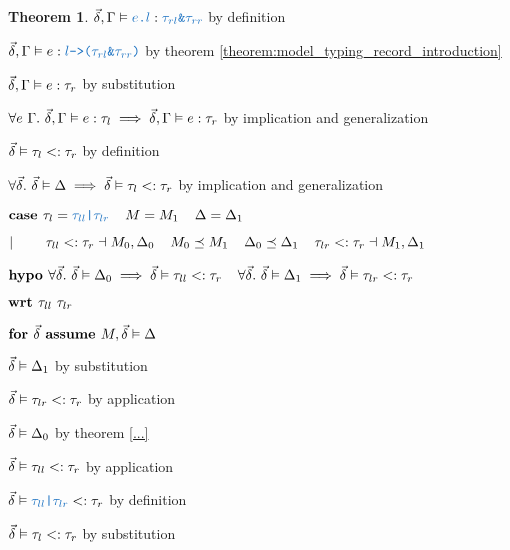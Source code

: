 \documentclass[acmsmall]{acmart}
\theoremstyle{definition}
\newtheorem{theorem}{Theorem}[section]
\begin{document}
\begin{theorem}
          \item \Z\Z\Z\Z $\vec{\delta}, \Gamma \satisfies \obj{$e$.$l$} \hastype \obj{$\tau_{rl}$\&$\tau_{rr}$}$ by definition
          \item \Z\Z\Z\Z $\vec{\delta}, \Gamma \satisfies e \hastype \obj{$l$->($\tau_{rl}$\&$\tau_{rr}$)}$ by theorem \ref{theorem:model_typing_record_introduction} 
          \item \Z\Z\Z\Z $\vec{\delta}, \Gamma \vDash e : \tau_r$ by substitution 
        \item \Z\Z\Z $\forall e\ \Gamma .\ \vec{\delta}, \Gamma \vDash e : \tau_l \implies 
          \vec{\delta}, \Gamma \vDash e : \tau_r
        $ by implication and generalization
        \item \Z\Z\Z $\vec{\delta} \vDash \tau_l <: \tau_r$
        by definition 
      \item \Z\Z $\forall \vec{\delta} .\ \vec{\delta} \vDash \Delta \implies \vec{\delta} \vDash \tau_l <: \tau_r$ 
      by implication and generalization 


    \item \Z $\B{case } 
      \tau_l = \obj{$\tau_{ll}$|$\tau_{lr}$}
      \I
      M = M_1
      \I
      \Delta = \Delta_1
    $
    \item \Z $|\ \ \ \ \ \ \ 
      \tau_{ll} <: \tau_r
      \dashv M_0, \Delta_0
      \hspace{4mm}
      M_0 \preceq M_1
      \hspace{4mm}
      \Delta_0 \preceq \Delta_1
      \hspace{4mm}
      \tau_{lr} <: \tau_r
      \dashv M_1, \Delta_1
    $

    \item \Z $\textbf{hypo } 
      \forall \vec{\delta} .\ \vec{\delta} \vDash \Delta_0 \implies \vec{\delta} \vDash \tau_{ll} <: \tau_r
      \hspace{4mm}
      \forall \vec{\delta} .\ \vec{\delta} \vDash \Delta_1 \implies \vec{\delta} \vDash \tau_{lr} <: \tau_r
    $
    \item \Z $\textbf{wrt } \tau_{ll}\ \tau_{lr}$

      \item \Z\Z $\textbf{for } \vec{\delta} \textbf{ assume } M, \vec{\delta} \vDash \Delta$
        \item \Z\Z\Z $\vec{\delta} \vDash \Delta_1$ by substitution 
        \item \Z\Z\Z $\vec{\delta} \vDash \tau_{lr} <: \tau_r$ by application 
        \item \Z\Z\Z $\vec{\delta} \vDash \Delta_0$ by theorem \ref{...}  
        \item \Z\Z\Z $\vec{\delta} \vDash \tau_{ll} <: \tau_r$ by application 
        \item \Z\Z\Z $\vec{\delta} \satisfies \obj{$\tau_{ll}$|$\tau_{lr}$} \subtypes \tau_r$ 
        by definition
        \item \Z\Z\Z $\vec{\delta} \vDash \tau_l <: \tau_r$ 
        by substitution 


\end{theorem}
\end{document}
